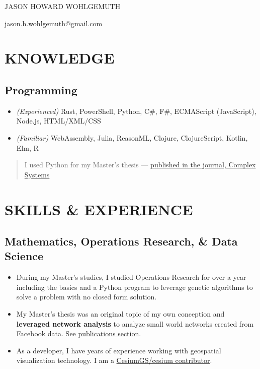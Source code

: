 \documentclass[10pt]{article}
\def\tightlist{}
\begin{document}
\begin{center}\Huge {JASON HOWARD WOHLGEMUTH}\end{center}
\begin{center}jason.h.wohlgemuth@gmail.com\end{center}

\section{KNOWLEDGE}\label{knowledge}

\subsection{Programming}\label{programming}

\begin{itemize}
\tightlist
\item
  \emph{(Experienced)} Rust, PowerShell, Python, C\#, F\#, ECMAScript
  (JavaScript), Node.js, HTML/XML/CSS
\item
  \emph{(Familiar)} WebAssembly, Julia, ReasonML, Clojure,
  ClojureScript, Kotlin, Elm, R
\end{itemize}

\begin{quote}
I used Python for my Master's thesis ---
\href{https://www.complex-systems.com/abstracts/v23_i03_a01/}{published
in the journal, Complex Systems}
\end{quote}

\section{SKILLS \& EXPERIENCE}\label{skills-experience}

\subsection{Mathematics, Operations Research, \& Data
Science}\label{mathematics-operations-research-data-science}

\begin{itemize}
\tightlist
\item
  During my Master's studies, I studied Operations Research for over a
  year including the basics and a Python program to leverage genetic
  algorithms to solve a problem with no closed form solution.
\item
  My Master's thesis was an original topic of my own conception and
  \textbf{leveraged network analysis} to analyze small world networks
  created from Facebook data. See
  \hyperref[publications-citations]{publications section}.
\item
  As a developer, I have years of experience working with geospatial
  visualization technology. I am a
  \href{https://github.com/CesiumGS/cesium/blob/main/CONTRIBUTORS.md}{CesiumGS/cesium
  contributor}.
\end{itemize}
\end{document}
